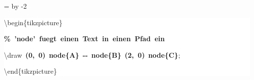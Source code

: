 \begingroup
\ttfamily
{}
=\textwidth
\advance{} by -2\fboxsep
\noindent
\colorbox{background}
{%
\parbox{\dimen255}
{%
\rule[-0.5ex]{0pt}{2.5ex}\hspace*{0.0em}\textbackslash{}begin\{tikzpicture\}\\
\rule[-0.5ex]{0pt}{2.5ex}\hspace*{1.0em}\textcolor{G}{\textbf{\%~'node'~fuegt~einen~Text~in~einen~Pfad~ein}}\\
\rule[-0.5ex]{0pt}{2.5ex}\hspace*{1.0em}\textbackslash{}draw~\textcolor{B}{\textbf{(0,~0)}}~\textcolor{R}{\textbf{node\{A\}}}~\textcolor{B}{\textbf{{-}{-}}}~\textcolor{R}{\textbf{node\{B\}}}~\textcolor{B}{\textbf{(2,~0)}}~\textcolor{R}{\textbf{node\{C\}}};\\
\rule[-0.5ex]{0pt}{2.5ex}\hspace*{0.0em}\textbackslash{}end\{tikzpicture\}}%
}%
\endgroup
